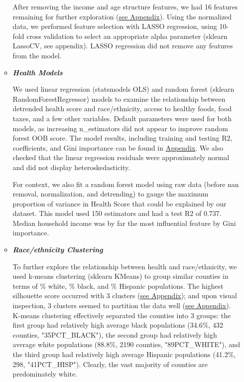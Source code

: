 \documentclass{article}
\begin{document}
\begin{itemize}[leftmargin=0pt]
\begin{itemize}
After removing the income and age structure features, we had 16 features remaining for further exploration (\hyperref[fig:lassocv]{see Appendix}). Using the normalized data, we performed feature selection with LASSO regression, using 10-fold cross validation to select an appropriate alpha parameter (sklearn LassoCV, see appendix). LASSO regression did not remove any features from the model. 

\item[] \textbf{\textit{Health Models}}

We used linear regression (statsmodels OLS) and random forest (sklearn RandomForestRegressor) models to examine the relationship between detrended health score and race/ethnicity, access to healthy foods, food taxes, and a few other variables. Default parameters were used for both models, as increasing n\_estimators did not appear to improve random forest OOB score. The model results, including training and testing R2, coefficients, and Gini importance can be found in \hyperref[fig:statsmodelsOLS]{Appendix}. We also checked that the linear regression residuals were approximately normal and did not display heteroskedasticity.

For context, we also fit a random forest model using raw data (before nan removal, normalization, and detrending) to gauge the maximum proportion of variance in Health Score that could be explained by our dataset. This model used 150 estimators and had a test R2 of 0.737. Median household income was by far the most influential feature by Gini importance.

\item[] \textbf{\textit{Race/ethnicity Clustering}}

To further explore the relationship between health and race/ethnicity, we used k-means clustering (sklearn KMeans) to group similar counties in terms of \% white, \% black, and \% Hispanic populations. The highest silhouette score occurred with 3 clusters (\hyperref[fig:kmeans_scores]{see Appendix}); and upon visual inspection, 3 clusters seemed to partition the data well (\hyperref[fig:kmeans_pairplot]{see Appendix}). K-means clustering effectively separated the counties into 3 groups: the first group had relatively high average black populations (34.6\%, 432 counties, "35PCT\_BLACK"), the second group had relatively high average white populations (88.8\%, 2190 counties, "89PCT\_WHITE"), and the third group had relatively high average Hispanic populations (41.2\%, 298, "41PCT\_HISP"). Clearly, the vast majority of counties are predominately white. 


\end{itemize}
\end{itemize}
\end{document}
